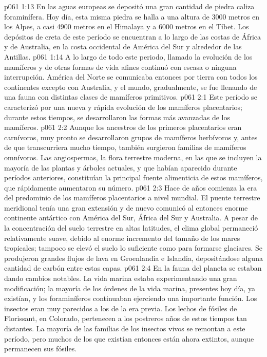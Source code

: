 \vs p061 1:13 En las aguas europeas se depositó una gran cantidad de piedra caliza foraminífera. Hoy día, esta misma piedra se halla a una altura de 3000 metros en los Alpes, a casi 4900 metros en el Himalaya y a 6000 metros en el Tíbet. Los depósitos de creta de este período se encuentran a lo largo de las costas de África y de Australia, en la costa occidental de América del Sur y alrededor de las Antillas.
\vs p061 1:14 \pc A lo largo de todo este periodo, llamado  la evolución de los mamíferos y de otras formas de vida afines continuó con escasa o ninguna interrupción. América del Norte se comunicaba entonces por tierra con todos los continentes excepto con Australia, y el mundo, gradualmente, se fue llenando de una fauna con distintas clases de mamíferos primitivos.
\vs p061 2:1 Este período se caracterizó por una nueva y rápida evolución de los mamíferos placentarios; durante estos tiempos, se desarrollaron las formas más avanzadas de los mamíferos.
\vs p061 2:2 Aunque los ancestros de los primeros placentarios eran carnívoros, muy pronto se desarrollaron grupos de mamíferos herbívoros y, antes de que transcurriera mucho tiempo, también surgieron familias de mamíferos omnívoros. Las angiospermas, la flora terrestre moderna, en las que se incluyen la mayoría de las plantas y árboles actuales, y que habían aparecido durante períodos anteriores, constituían la principal fuente alimenticia de estos mamíferos, que rápidamente aumentaron su número.
\vs p061 2:3 \pc Hace  de años comienza la era del predominio de los mamíferos placentarios a nivel mundial. El puente terrestre meridional tenía una gran extensión y de nuevo comunicó al entonces enorme continente antártico con América del Sur, África del Sur y Australia. A pesar de la concentración del suelo terrestre en altas latitudes, el clima global permaneció relativamente suave, debido al enorme incremento del tamaño de los mares tropicales; tampoco se elevó el suelo lo suficiente como para formarse glaciares. Se produjeron grandes flujos de lava en Groenlandia e Islandia, depositándose alguna cantidad de carbón entre estas capas.
\vs p061 2:4 En la fauna del planeta se estaban dando cambios notables. La vida marina estaba experimentando una gran modificación; la mayoría de los órdenes de la vida marina, presentes hoy día, ya existían, y los foraminíferos continuaban ejerciendo una importante función. Los insectos eran muy parecidos a los de la era previa. Los lechos de fósiles de Florissant, en Colorado, pertenecen a los postreros años de estos tiempos tan distantes. La mayoría de las familias de los insectos vivos se remontan a este período, pero muchos de los que existían entonces están ahora extintos, aunque permanecen sus fósiles.
